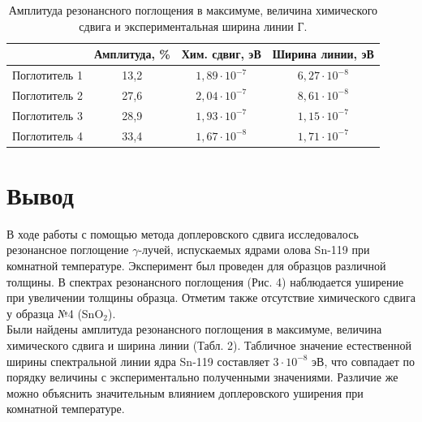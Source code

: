 \documentclass[a4paper,12pt]{article} %
\begin{document}
\begin{table}[h!]

\begin{tabular}{|c|c|c|c|}
\hline
              & Амплитуда, \% & Хим. сдвиг, эВ       & Ширина линии, эВ     \\ \hline
Поглотитель 1 & 13,2          & $1,89 \cdot 10^{-7}$ & $6,27 \cdot 10^{-8}$ \\ \hline
Поглотитель 2 & 27,6          & $2,04 \cdot 10^{-7}$ & $8,61 \cdot 10^{-8}$ \\ \hline
Поглотитель 3 & 28,9          & $1,93 \cdot 10^{-7}$ & $1,15 \cdot 10^{-7}$ \\ \hline
Поглотитель 4 & 33,4          & $1,67 \cdot 10^{-8}$ & $1,71 \cdot 10^{-7}$ \\ \hline
\end{tabular}
\label{tab2}
\caption{Амплитуда резонансного поглощения в максимуме, величина
химического сдвига и экспериментальная ширина линии Г.}
\end{table}


\section{Вывод}

В ходе работы с помощью метода доплеровского сдвига исследовалось резонансное поглощение $\gamma$-лучей, испускаемых ядрами олова Sn-119 при комнатной температуре. Эксперимент был проведен для образцов различной толщины. В спектрах резонансного поглощения (Рис. 4) наблюдается уширение при увеличении толщины образца. Отметим также отсутствие химического сдвига у образца №4 (SnO$_2$).\\


\noindent Были найдены амплитуда резонансного поглощения в максимуме, величина
химического сдвига и ширина линии (Табл. 2). Табличное значение естественной ширины спектральной линии ядра Sn-119 составляет $3 \cdot 10^{-8}$ эВ, что совпадает по порядку величины с экспериментально полученными значениями. Различие же можно объяснить значительным влиянием доплеровского уширения при комнатной температуре.
\end{document}
